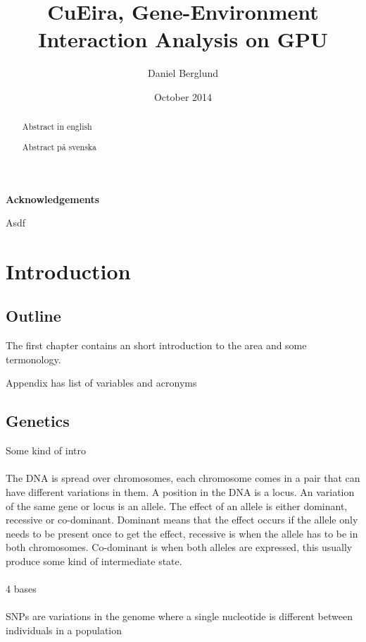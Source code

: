 \documentclass[10pt,a4paper]{report}
\title{CuEira, Gene-Environment Interaction Analysis on GPU}
\author{Daniel Berglund}
\date{October 2014}
\makeatletter
\newcommand\ackname{Acknowledgements}
\newenvironment{acknowledgements}{
      \titlepage
      \null\vfil
      \@beginparpenalty\@lowpenalty
      \begin{center}%
        \bfseries \ackname
        \@endparpenalty\@M
      \end{center}}%
     {\par\vfil\null\endtitlepage}
\newenvironment{acknowledgements}{
      \if@twocolumn
        \section*{\abstractname}
      \else
        \small
        \begin{center}
          {\bfseries \ackname\vspace{-.5em}\vspace{\z@}}
        \end{center}
        \quotation
      \fi}
      {\if@twocolumn\else\endquotation\fi}
\makeatother
\begin{document}
\maketitle
\thispagestyle{empty}

\clearpage
\thispagestyle{empty}
\begin{abstract}
Abstract in english
\end{abstract}

\clearpage
\thispagestyle{empty}
\begin{abstract}
Abstract på svenska
\end{abstract}

\clearpage
\thispagestyle{empty}
\begin{acknowledgements}
Asdf
\end{acknowledgements}

\clearpage
\tableofcontents
\thispagestyle{empty}

\clearpage
\setcounter{page}{1}
\chapter{Introduction}

\section{Outline}
The first chapter contains an short introduction to the area and some termonology.

Appendix has list of variables and acronyms

\section{Genetics}
Some kind of intro\\
\\
The DNA is spread over chromosomes, each chromosome comes in a pair that can have different variations in them. A position in the DNA is a locus. An variation of the same gene or locus is an allele. The effect of an allele is either dominant, recessive or co-dominant. Dominant means that the effect occurs if the allele only needs to be present once to get the effect, recessive is when the allele has to be in both chromosomes. Co-dominant is when both alleles are expressed, this usually produce some kind of intermediate state.\cite{sadava_life}\\
\\
4 bases\cite{sadava_life}\\
\\
SNPs are variations in the genome where a single nucleotide is different between individuals in a population\cite{fareed_snp}
\end{document}
